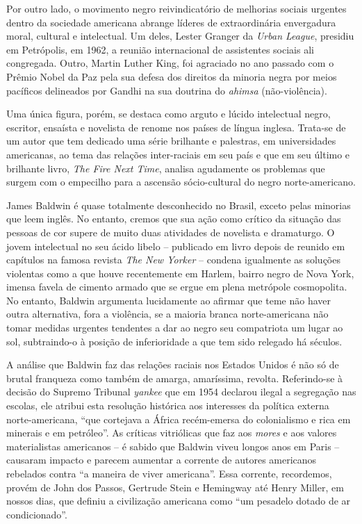 \documentclass[
  letterpaper,
  DIV=11,
  numbers=noendperiod]{scrreprt}
\begin{document}
Por outro lado, o movimento negro reivindicatório de melhorias sociais
urgentes dentro da sociedade americana abrange líderes de extraordinária
envergadura moral, cultural e intelectual. Um deles, Lester Granger da
\emph{Urban League}, presidiu em Petrópolis, em 1962, a reunião
internacional de assistentes sociais ali congregada. Outro, Martin
Luther King, foi agraciado no ano passado com o Prêmio Nobel da Paz pela
sua defesa dos direitos da minoria negra por meios pacíficos delineados
por Gandhi na sua doutrina do \emph{ahimsa} (não-violência).

Uma única figura, porém, se destaca como arguto e lúcido intelectual
negro, escritor, ensaísta e novelista de renome nos países de língua
inglesa. Trata-se de um autor que tem dedicado uma série brilhante e
palestras, em universidades americanas, ao tema das relações
inter-raciais em seu país e que em seu último e brilhante livro,
\emph{The Fire Next Time}, analisa agudamente os problemas que surgem
com o empecilho para a ascensão sócio-cultural do negro norte-americano.

James Baldwin é quase totalmente desconhecido no Brasil, exceto pelas
minorias que leem inglês. No entanto, cremos que sua ação como crítico
da situação das pessoas de cor supere de muito duas atividades de
novelista e dramaturgo. O jovem intelectual no seu ácido libelo --
publicado em livro depois de reunido em capítulos na famosa revista
\emph{The New Yorker} -- condena igualmente as soluções violentas como a
que houve recentemente em Harlem, bairro negro de Nova York, imensa
favela de cimento armado que se ergue em plena metrópole cosmopolita. No
entanto, Baldwin argumenta lucidamente ao afirmar que teme não haver
outra alternativa, fora a violência, se a maioria branca norte-americana
não tomar medidas urgentes tendentes a dar ao negro seu compatriota um
lugar ao sol, subtraindo-o à posição de inferioridade a que tem sido
relegado há séculos.

A análise que Baldwin faz das relações raciais nos Estados Unidos é não
só de brutal franqueza como também de amarga, amaríssima, revolta.
Referindo-se à decisão do Supremo Tribunal \emph{yankee} que em 1954
declarou ilegal a segregação nas escolas, ele atribui esta resolução
histórica aos interesses da política externa norte-americana, ``que
cortejava a África recém-emersa do colonialismo e rica em minerais e em
petróleo''. As críticas vitriólicas que faz aos \emph{mores} e aos
valores materialistas americanos -- é sabido que Baldwin viveu longos
anos em Paris -- causaram impacto e parecem aumentar a corrente de
autores americanos rebelados contra ``a maneira de viver americana''.
Essa corrente, recordemos, provém de John dos Passos, Gertrude Stein e
Hemingway até Henry Miller, em nossos dias, que definiu a civilização
americana como ``um pesadelo dotado de ar condicionado''.
\end{document}
